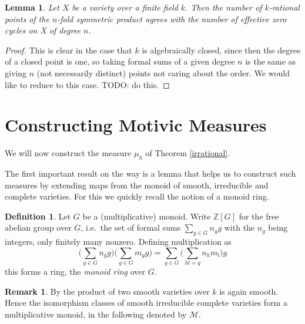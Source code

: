 \documentclass[11pt, a4paper, german, twoside]{article}
\theoremstyle{plain}
\newtheorem{lemma}[theorem]{Lemma}
\theoremstyle{definition}
\newtheorem{definition}[theorem]{Definition}
\newtheorem{remark}[theorem]{Remark}
\begin{document}
\begin{lemma}
    Let $X$ be a variety over a finite field $k$. Then the number of $k$-rational points of the $n$-fold symmetric product agrees
    with the number of effective zero cycles on X of degree $n$.
\end{lemma}
\begin{proof}
    This is clear in the case that $k$ is algebraically closed, since then the degree of a closed point is one, so taking formal sums of
    a given degree $n$ is the same as giving $n$ (not necessarily distinct) points not caring about the order.
    We would like to reduce to this case. TODO: do this.
\end{proof}

\section{Constructing Motivic Measures}
\label{const}
We will now construct the measure $\mu_h$ of Theorem \ref{irrational}.

The first important result on the way is a lemma that helps us to construct such measures by extending maps from the monoid of smooth, irreducible
and complete varieties. For this we quickly recall the notion of a monoid ring.

\begin{definition}
    Let $G$ be a (multiplicative) monoid. Write $\mathbb{Z}[G]$ for the free abelian group over $G$, i.e.\ the set of formal sums
    $\sum_{g \in G} n_g g$ with the $n_g$ being integers, only finitely many nonzero.
    Defining multiplication as
    \[
        \Big(\sum_{g \in G} n_g g\Big)\Big(\sum_{g \in G} m_g g \Big) = \sum_{g \in G} \Big(\sum_{hl = g} n_h m_l\Big) g
    \]
    this forms a ring, the \emph{monoid ring} over $G$.
\end{definition}

\begin{remark}
    By \cite[Prop. 10.1 (d)]{Ha} the product of two smooth varieties over $k$ is again smooth. Hence the isomorphism classes of smooth
    irreducible complete varieties form a multiplicative monoid, in the following denoted by $\mathcal{M}$.
\end{remark}
\end{document}
